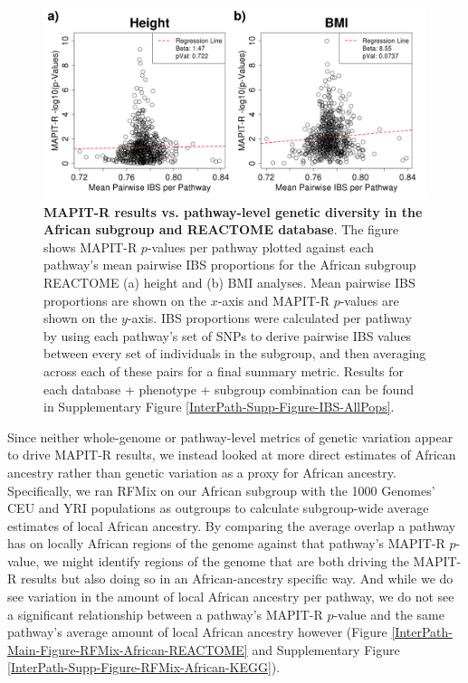\documentclass[12pt,a4paper]{article}
\begin{document}

\begin{figure}[htb]
\centering
\includegraphics[scale=.35]{Images/Main/InterPath_Main_Figure_IBS_vs4_African_REACTOME_noHLA.png}
\caption[TBD]{\textbf{MAPIT-R results vs. pathway-level genetic diversity in the African subgroup and REACTOME database}. The figure shows MAPIT-R $p$-values per pathway plotted against each pathway's mean pairwise IBS proportions for the African subgroup REACTOME (a) height and (b) BMI analyses. Mean pairwise IBS proportions are shown on the $x$-axis and MAPIT-R $p$-values are shown on the $y$-axis. IBS proportions were calculated per pathway by using each pathway's set of SNPs to derive pairwise IBS values between every set of individuals in the subgroup, and then averaging across each of these pairs for a final summary metric. Results for each database + phenotype + subgroup combination can be found in Supplementary Figure \ref{InterPath-Supp-Figure-IBS-AllPops}.}
\label{InterPath-Main-Figure-IBS-African}
\end{figure}

Since neither whole-genome or pathway-level metrics of genetic variation appear to drive MAPIT-R results, we instead looked at more direct estimates of African ancestry rather than genetic variation as a proxy for African ancestry. Specifically, we ran RFMix \citep{Maples2013} on our African subgroup with the 1000 Genomes' CEU and YRI \citep{Genomes2015} populations as outgroups to calculate subgroup-wide average estimates of local African ancestry. By comparing the average overlap a pathway has on locally African regions of the genome against that pathway's MAPIT-R $p$-value, we might identify regions of the genome that are both driving the MAPIT-R results but also doing so in an African-ancestry specific way. And while we do see variation in the amount of local African ancestry per pathway, we do not see a significant relationship between a pathway's MAPIT-R $p$-value and the same pathway's average amount of local African ancestry however (Figure \ref{InterPath-Main-Figure-RFMix-African-REACTOME} and Supplementary Figure \ref{InterPath-Supp-Figure-RFMix-African-KEGG}).    
\end{document}

